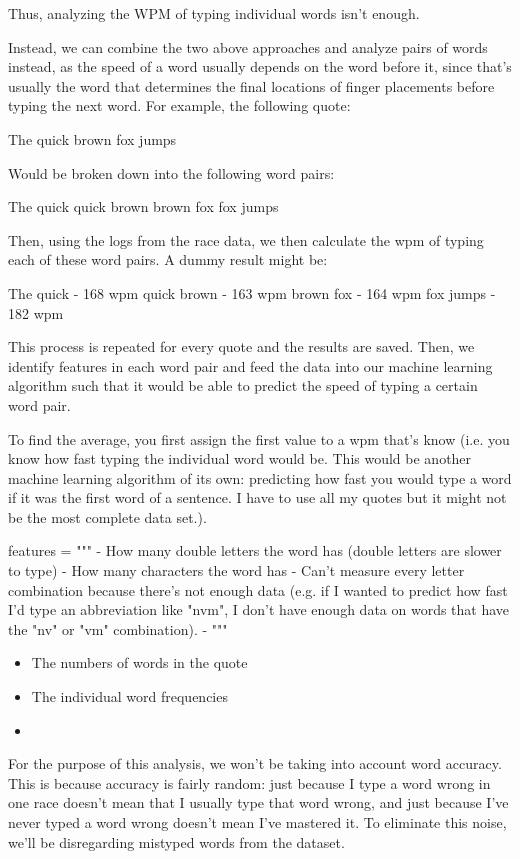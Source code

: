 \documentclass{article}
\begin{document}
Thus, analyzing the WPM of typing individual words isn't enough.

Instead, we can combine the two above approaches and analyze pairs of words instead, as the speed of a word usually depends on the word before it, since that's usually the word that determines the final locations of finger placements before typing the next word. For example, the following quote:

The quick brown fox jumps

Would be broken down into the following word pairs:

The quick
quick brown
brown fox
fox jumps

Then, using the logs from the race data, we then calculate the wpm of typing each of these word pairs. A dummy result might be:

The quick - 168 wpm
quick brown - 163 wpm
brown fox - 164 wpm
fox jumps - 182 wpm

This process is repeated for every quote and the results are saved. Then, we identify features in each word pair and feed the data into our machine learning algorithm such that it would be able to predict the speed of typing a certain word pair.

To find the average, you first assign the first value to a wpm that's know (i.e. you know how fast typing the individual word would be. This would be another machine learning algorithm of its own: predicting how fast you would type a word if it was the first word of a sentence. I have to use all my quotes but it might not be the most complete data set.).

\begin{pycode}
features = """
	- How many double letters the word has (double letters are slower to type)
	- How many characters the word has
	- Can't measure every letter combination because there's not enough data (e.g. if I wanted to predict how fast I'd type an abbreviation like "nvm", I don't have enough data on words that have the "nv" or "vm" combination).
	-
"""
\end{pycode}

\begin{itemize}
	\item The numbers of words in the quote
	\item The individual word frequencies
	\item
\end{itemize}

For the purpose of this analysis, we won't be taking into account word accuracy. This is because accuracy is fairly random: just because I type a word wrong in one race doesn't mean that I usually type that word wrong, and just because I've never typed a word wrong doesn't mean I've mastered it. To eliminate this noise, we'll be disregarding mistyped words from the dataset.
\end{document}
